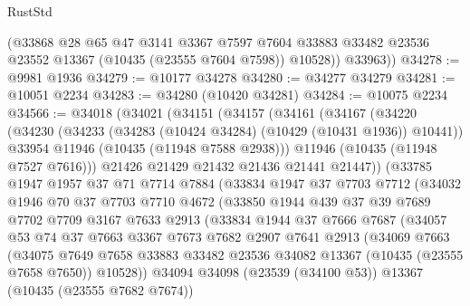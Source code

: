\begin{lexlean}{RustStd}
\begin{coremodule}
          (@33868
            @28
            @65
            @47
            @3141
            @3367
            @7597
            @7604
            @33883
            @33482
            @23536
            @23552
            @13367
            (@10435 (@23555 @7604 @7598))
            @10528))
        @33963))
@34278 := @9981 @1936
@34279 := @10177 @34278
@34280 := @34277 @34279
@34281 := @10051 @2234
@34283 := @34280 (@10420 @34281)
@34284 := @10075 @2234
@34566 := @34018
    (@34021
      (@34151
        (@34157
          (@34161
            (@34167
              (@34220
                (@34230
                  (@34233 (@34283 (@10424 @34284) (@10429 (@10431 @1936)) @10441))
                  @33954
                  @11946
                  (@10435 (@11948 @7588 @2938)))
                @11946
                (@10435 (@11948 @7527 @7616)))
              @21426
              @21429
              @21432
              @21436
              @21441
              @21447))
          (@33785
            @1947
            @1957
            @37
            @71
            @7714
            @7884
            (@33834
              @1947
              @37
              @7703
              @7712
              (@34032
                @1946
                @70
                @37
                @7703
                @7710
                @4672
                (@33850
                  @1944
                  @439
                  @37
                  @39
                  @7689
                  @7702
                  @7709
                  @3167
                  @7633
                  @2913
                  (@33834
                    @1944
                    @37
                    @7666
                    @7687
                    (@34057
                      @53
                      @74
                      @37
                      @7663
                      @3367
                      @7673
                      @7682
                      @2907
                      @7641
                      @2913
                      (@34069
                        @7663
                        (@34075
                          @7649
                          @7658
                          @33883
                          @33482
                          @23536
                          @34082
                          @13367
                          (@10435 (@23555 @7658 @7650))
                          @10528))
                      @34094
                      @34098
                      (@23539 (@34100 @53))
                      @13367
                      (@10435 (@23555 @7682 @7674))

\end{coremodule}
\end{lexlean}
